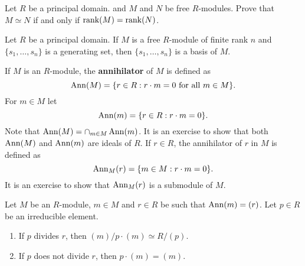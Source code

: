 \begin{exercise}
    Let $R$ be a principal domain. 
    and $M$ and $N$ be free $R$-modules. Prove that 
    $M\simeq N$ if and only if $\operatorname{rank}(M)=\operatorname{rank}(N)$. 	
\end{exercise}

\begin{exercise}
\label{xca:base}
    Let $R$ be a principal domain. 
    If $M$ is a free $R$-module of finite rank $n$ and $\{s_1,\dots,s_n\}$ 
    is a generating set, then $\{s_1,\dots,s_n\}$ is a basis of $M$.
\end{exercise}

If $M$ is an $R$-module, the \textbf{annihilator} of $M$ 
is defined as 
\[
\operatorname{Ann}(M)=\{r\in R:r\cdot m=0\text{ for all $m\in M$}\}.
\] 
For $m\in M$ let 
\[
\operatorname{Ann}(m)=\{r\in R:r\cdot m=0\}.
\]  
Note that $\operatorname{Ann}(M)=\cap_{m\in M}\operatorname{Ann}(m)$. 
It is an exercise to show that both 
$\operatorname{Ann}(M)$ and $\operatorname{Ann}(m)$ are ideals of $R$. 
If $r\in R$, the annihilator of $r$ in $M$ 
is defined as 
\[
\operatorname{Ann}_M(r)=\{m\in M:r\cdot m=0\}.
\] 
It is an exercise to show that $\operatorname{Ann}_M(r)$ is a submodule of 
$M$. 

\begin{exercise}
Let $M$ be an $R$-module, $m\in M$ and $r\in R$ be such that $\operatorname{Ann}(m)=(r)$.
Let $p\in R$ be an irreducible element. 
\begin{enumerate}
\item If $p$ divides $r$, then $(m)/p\cdot (m)\simeq R/(p)$.
\item If $p$ does not divide $r$, then $p\cdot (m)=(m)$.
\end{enumerate}
\end{exercise}



